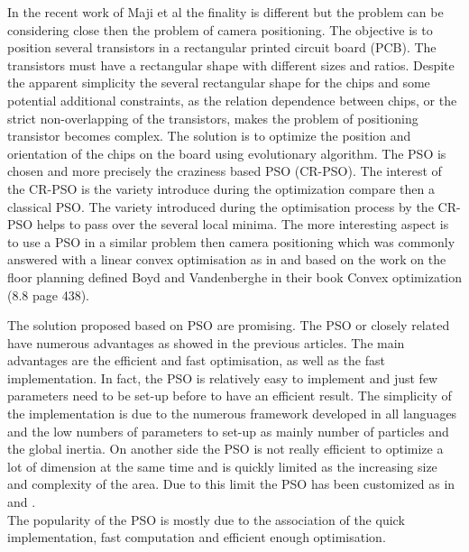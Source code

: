  In the recent work of Maji et al\cite{143*maji2015} the finality is different but the problem can be considering close then the problem of camera positioning. 
The objective is to position several transistors in a rectangular printed circuit board (PCB).
The transistors must have a rectangular shape with different sizes and ratios. 
  Despite the apparent simplicity the several rectangular shape for the chips and some potential additional constraints, as the relation dependence between chips, or the strict non-overlapping of the transistors, makes the problem of positioning transistor becomes complex. The solution is to optimize the position and orientation of the chips on the board using evolutionary algorithm. The  PSO is chosen and more precisely the craziness based PSO (CR-PSO). The interest of the CR-PSO is the variety introduce during the optimization compare then a classical PSO. The variety introduced during the optimisation process by the CR-PSO  helps to pass over the several local minima. 
  The more interesting aspect is to use a PSO in a similar problem then camera positioning which was commonly answered with a linear convex optimisation as in \citep{62*vijayan1991} and  based on the work on the floor planning defined Boyd and Vandenberghe in their book Convex optimization \cite{boyd2004convex}(8.8 page 438).  
  
The solution proposed based on PSO are promising. The PSO or closely related have numerous advantages as showed in the previous articles.
 The main advantages are the efficient and fast optimisation, as well as the fast implementation. In fact, the PSO is  relatively easy to implement and just few parameters need to be set-up before to have an efficient result. The simplicity of the implementation is due to the numerous framework developed in all languages and the low numbers of parameters to set-up as mainly number of particles and the global inertia.	
  On another side the PSO is not really efficient to optimize a lot of dimension at the same time and is quickly limited as the increasing size and complexity of the area. Due to this limit the PSO has been customized as in \citep{143*maji2015}  and \citep{194*fu2010}. \\
The popularity of the PSO is mostly due to the association of the quick implementation, fast computation and efficient enough optimisation.
 
